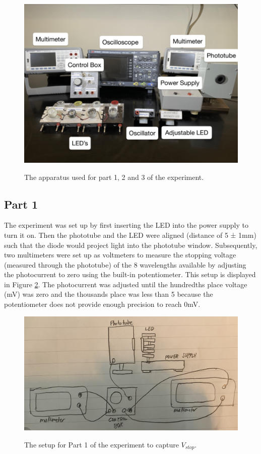 \documentclass[12pt,twocolumn]{article}
\begin{document}
\begin{figure}[H]
\begin{centering}
\includegraphics[width=0.5 \textwidth]{img/apparatus.png}
\label{fig:apparatus}
\caption{The apparatus used for part 1, 2 and 3 of the experiment.}
\end{centering}
\end{figure}

\subsection*{Part 1}
The experiment was set up by first inserting the LED into the power supply to turn it on. 
Then the phototube and the LED were aligned (distance of 5 ± 1mm) such that the diode would project light into the phototube window. 
Subsequently, two multimeters were set up as voltmeters to measure the stopping voltage (measured through the phototube) of the 8 wavelengths 
available by adjusting the photocurrent to zero using the built-in potentiometer. This setup is displayed in Figure \ref{fig:Part1_Setup}.
The photocurrent was adjusted until the hundredths place voltage (mV) was zero and the thousands place was less than 5 because the potentiometer does not provide enough precision to reach 0mV.

\begin{figure}[H]
\begin{centering}
\includegraphics[width=0.5 \textwidth]{img/part1_setup.png}
\label{fig:Part1_Setup}
\caption{The setup for Part 1 of the experiment to capture $V_{stop}$.}
\end{centering}
\end{figure}
\end{document}
